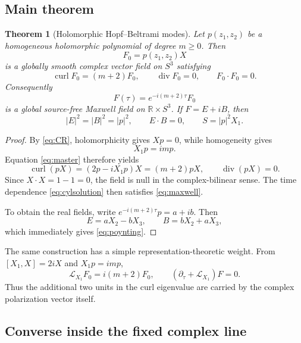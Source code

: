 \documentclass[11pt,a4paper]{article}
\numberwithin{equation}{section}
\newtheorem{theorem}{Theorem}[section]
\theoremstyle{remark}
\newcommand{\curl}{\operatorname{curl}}
\newcommand{\divg}{\operatorname{div}}
\newcommand{\RR}{\mathbb{R}}
\begin{document}
\subsection{Main theorem}

\begin{theorem}[Holomorphic Hopf--Beltrami modes]\label{thm:main}
Let \(p(z_1,z_2)\) be a homogeneous holomorphic polynomial of degree \(m\ge0\). Then
\begin{equation}\label{eq:F0}
 F_0=p(z_1,z_2)X
\end{equation}
is a globally smooth complex vector field on \(S^3\) satisfying
\begin{equation}\label{eq:mainidentities}
 \curl F_0=(m+2)F_0,
 \qquad
 \divg F_0=0,
 \qquad
 F_0\cdot F_0=0.
\end{equation}
Consequently
\begin{equation}\label{eq:cylsolution}
 F(\tau)=e^{-i(m+2)\tau}F_0
\end{equation}
is a global source-free Maxwell field on \(\RR\times S^3\). If \(F=E+iB\), then
\begin{equation}\label{eq:poynting}
 |E|^2=|B|^2=|p|^2,
 \qquad E\cdot B=0,
 \qquad S=|p|^2X_1.
\end{equation}
\end{theorem}

\begin{proof}
By \eqref{eq:CR}, holomorphicity gives \(Xp=0\), while homogeneity gives
\[
 X_1p=imp.
\]
Equation \eqref{eq:master} therefore yields
\[
 \curl(pX)=(2p-iX_1p)X=(m+2)pX,
 \qquad
 \divg(pX)=0.
\]
Since \(X\cdot X=1-1=0\), the field is null in the complex-bilinear sense. The time dependence \eqref{eq:cylsolution} then satisfies \eqref{eq:maxwell}.

To obtain the real fields, write \(e^{-i(m+2)\tau}p=a+ib\). Then
\[
 E=aX_2-bX_3,
 \qquad
 B=bX_2+aX_3,
\]
which immediately gives \eqref{eq:poynting}.
\end{proof}

The same construction has a simple representation-theoretic weight. From \([X_1,X]=2iX\) and \(X_1p=imp\),
\begin{equation}\label{eq:lieweight}
 \mathcal L_{X_1}F_0=i(m+2)F_0,
 \qquad
 (\partial_\tau+\mathcal L_{X_1})F=0.
\end{equation}
Thus the additional two units in the curl eigenvalue are carried by the complex polarization vector itself.

\subsection{Converse inside the fixed complex line}
\end{document}
